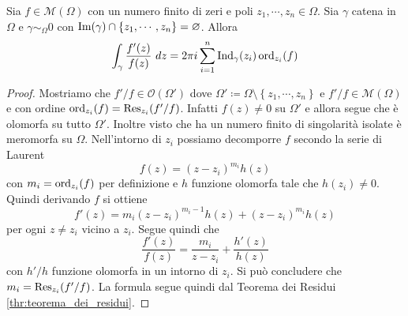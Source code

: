 \begin{theorem}
	\label{thr:principio_dell_argomento}
  Sia $f \in \mathcal{M}(\Omega)$ con un numero finito di zeri e poli $z_1,
  \cdots, z_n \in \Omega$. Sia $\gamma$ catena in $\Omega$ e $\gamma \sim_\Omega
  0$ con $\operatorname{Im}(\gamma) \cap \left\{ z_1, \cdots, z_n\right\} = \varnothing$.
  Allora 
  \begin{equation*}
    \int_{\gamma} \frac{f'(z)}{f(z)}\ dz = 2\pi i \sum_{i=1}^{n}
    \operatorname{Ind}_\gamma(z_i) \operatorname{ord}_{z_i}(f)
  \end{equation*}
\end{theorem}
\begin{proof}
  Mostriamo che $f'/ f \in \mathcal{O}(\Omega')$ dove $\Omega' \coloneqq \Omega
  \setminus \left\{ z_1, \cdots, z_n \right\}$ e $f'/f \in \mathcal{M}(\Omega)$
  e con ordine $\operatorname{ord}_{z_i}(f) = \operatorname{Res}_{z_i}(f'/f)$.
  Infatti $f(z) \neq 0$ su $\Omega'$ e allora segue che è olomorfa su tutto
  $\Omega'$. Inoltre visto che ha un numero finito di singolarità isolate
  è meromorfa su $\Omega$. Nell'intorno di $z_i$ possiamo decomporre $f$ secondo
  la serie di Laurent
  \begin{equation*}
    f(z) = (z-z_i)^{m_i}h(z) 
  \end{equation*}
  con $m_i = \operatorname{ord}_{z_i}(f)$ per definizione e $h$ funzione olomorfa tale che
  $h(z_i) \neq 0$. Quindi derivando $f$ si ottiene 
  \begin{equation*}
    f'(z) = m_i(z-z_i)^{m_i-1}h(z) + (z-z_i)^{m_i}h(z)
  \end{equation*}
  per ogni $z \neq z_i$ vicino a $z_i$. Segue quindi che 
  \begin{equation*}
    \frac{f'(z)}{f(z)} = \frac{m_i}{z-z_i} + \frac{h'(z)}{h(z)}
  \end{equation*}
  con $h'/h$ funzione olomorfa in un intorno di $z_i$. Si può concludere che
  $m_i = \operatorname{Res}_{z_i}(f'/f)$. La formula segue quindi dal Teorema dei Residui \ref{thr:teorema_dei_residui}.
\end{proof}

